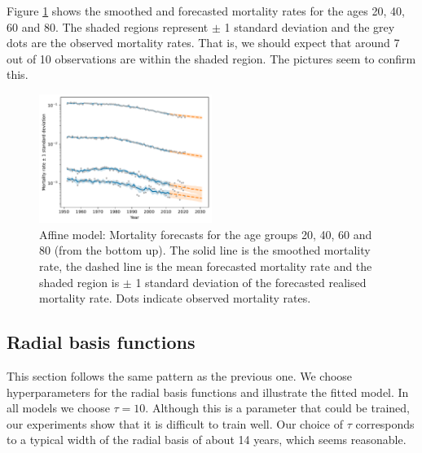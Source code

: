 \documentclass[11pt]{article}
\begin{document}
Figure \ref{fig:model_linear_forecast_sweden} shows the smoothed and forecasted mortality rates for the ages 20, 40, 60 and 80. The shaded regions represent $\pm$ 1 standard deviation and the grey dots are the observed mortality rates. That is, we should expect that around 7 out of 10 observations are within the shaded region. The pictures seem to confirm this.  
\begin{figure}
    \centering
    \includegraphics[width=0.5\textwidth]{figs/sweden_linear_1952_2011_Male_100_1_3rateVsTime.pdf}
    \caption{Affine model: Mortality forecasts for the age groups 20, 40, 60 and 80 (from the bottom up). The solid line is the smoothed mortality rate, the dashed line is the mean forecasted mortality rate and the shaded region is $\pm$ 1 standard deviation of the forecasted realised mortality rate. Dots indicate observed mortality rates.}\label{fig:model_linear_forecast_sweden}
\end{figure}

\subsection{Radial basis functions}

This section follows the same pattern as the previous one. We choose hyperparameters for the radial basis functions and illustrate the fitted model. In all models we choose $\tau=10$. Although this is a parameter that could be trained, our experiments show that it is difficult to train well. Our choice of $\tau$ corresponds to a typical width of the radial basis of about 14 years, which seems reasonable.
\end{document}
